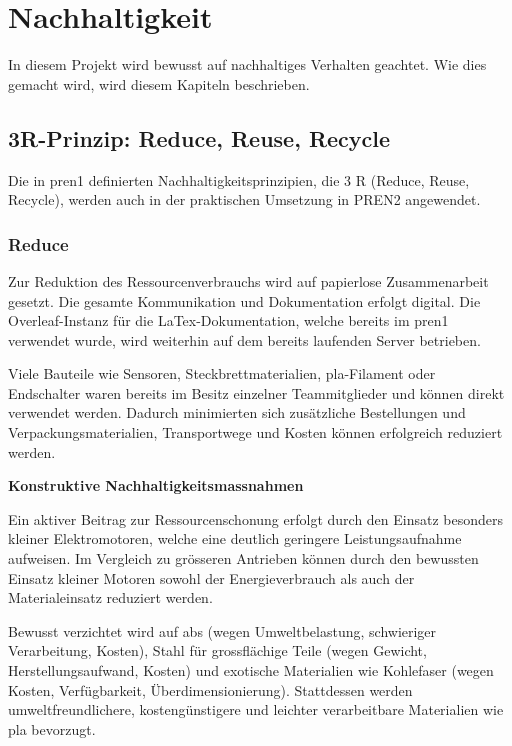 \section{Nachhaltigkeit}
\label{nachhaltigkeit}

In diesem Projekt wird bewusst auf nachhaltiges Verhalten geachtet. Wie dies gemacht wird, wird diesem Kapiteln beschrieben.

\subsection{3R-Prinzip: Reduce, Reuse, Recycle}

Die in \acrshort{pren1} definierten Nachhaltigkeitsprinzipien, die 3 R (Reduce, Reuse, Recycle), werden auch in der praktischen Umsetzung in PREN2 angewendet.  

\subsubsection{Reduce}

Zur Reduktion des Ressourcenverbrauchs wird auf papierlose Zusammenarbeit gesetzt. Die gesamte Kommunikation und Dokumentation erfolgt digital. Die Overleaf-Instanz für die LaTex-Dokumentation, welche bereits im \acrshort{pren1} verwendet wurde, wird weiterhin auf dem bereits laufenden Server betrieben.

Viele Bauteile wie Sensoren, Steckbrettmaterialien, \acrshort{pla}-Filament oder Endschalter waren bereits im Besitz einzelner Teammitglieder und können direkt verwendet werden. Dadurch minimierten sich zusätzliche Bestellungen und Verpackungsmaterialien, Transportwege und Kosten können erfolgreich reduziert werden.

\textbf{Konstruktive Nachhaltigkeitsmassnahmen}

Ein aktiver Beitrag zur Ressourcenschonung erfolgt durch den Einsatz besonders kleiner Elektromotoren, welche eine deutlich geringere Leistungsaufnahme aufweisen. Im Vergleich zu grösseren Antrieben können durch den bewussten Einsatz kleiner Motoren sowohl der Energieverbrauch als auch der Materialeinsatz reduziert werden. 

Bewusst verzichtet wird auf \acrshort{abs} (wegen Umweltbelastung, schwieriger Verarbeitung, Kosten), Stahl für grossflächige Teile (wegen Gewicht, Herstellungsaufwand, Kosten) und exotische Materialien wie Kohlefaser (wegen Kosten, Verfügbarkeit, Überdimensionierung). Stattdessen werden umweltfreundlichere, kostengünstigere und leichter verarbeitbare Materialien wie \acrshort{pla} bevorzugt.\cite{pla}



